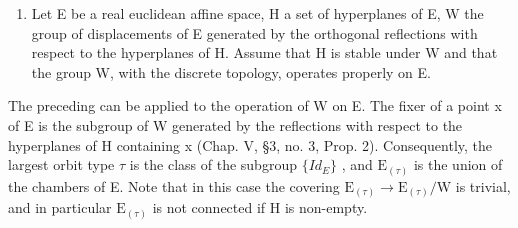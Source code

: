 \begin{enumerate}
\def\labelenumi{\arabic{enumi})}
\setcounter{enumi}{1}
\tightlist
\item
  Let E be a real euclidean affine space, H a set of hyperplanes of E, W the group of displacements of E generated by the orthogonal reflections with respect to the hyperplanes of H. Assume that H is stable under W and that the group W, with the discrete topology, operates properly on E.
\end{enumerate}

The preceding can be applied to the operation of W on E. The fixer of a point x of E is the subgroup of W generated by the reflections with respect to the hyperplanes of H containing x (Chap. V, §3, no. 3, Prop. 2). Consequently, the largest orbit type \(\tau\) is the class of the subgroup \(\{Id_{E}\}\) , and \(\mathrm{E}_{(\tau)}\) is the union of the chambers of E. Note that in this case the covering \(\mathrm{E}_{(\tau)} \to \mathrm{E}_{(\tau)}/\mathrm{W}\) is trivial, and in particular \(\mathrm{E}_{(\tau)}\) is not connected if H is non-empty.


